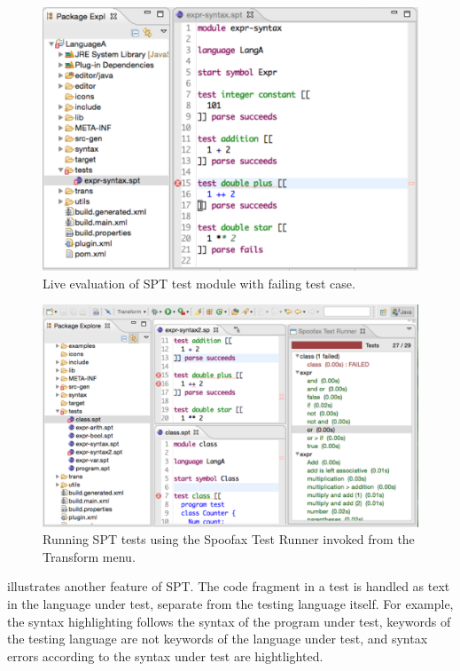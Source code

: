 \begin{figure}[t]
\includegraphics[width=\hsize]{tests/expr-syntax-spt.pdf}
\caption{Live evaluation of SPT test module with failing test case.}
\end{figure}

\begin{figure}[t]
\includegraphics[width=\hsize]{tests/spoofax-test-runner.pdf}
\caption{Running SPT tests using the Spoofax Test Runner invoked from the
Transform menu.}
\end{figure}

 illustrates another feature of SPT. The code fragment
in a test is handled as text in the language under test, separate from the 
testing language itself. 
For example, the syntax highlighting follows the syntax of the program under
test, keywords of the testing language are not keywords of the language under
test, and syntax errors according to the syntax under test are hightlighted.

